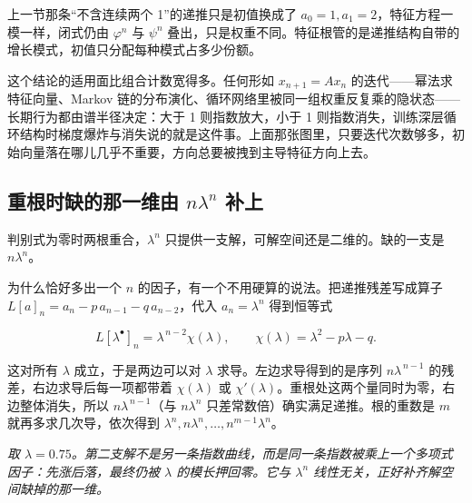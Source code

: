 上一节那条``不含连续两个 1''的递推只是初值换成了 \(a_0=1,a_1=2\)，特征方程一模一样，闭式仍由 \(\varphi^{n}\) 与 \(\psi^{n}\) 叠出，只是权重不同。特征根管的是递推结构自带的增长模式，初值只分配每种模式占多少份额。

这个结论的适用面比组合计数宽得多。任何形如 \(x_{n+1}=Ax_n\) 的迭代——幂法求特征向量、Markov 链的分布演化、循环网络里被同一组权重反复乘的隐状态——长期行为都由谱半径决定：大于 1 则指数放大，小于 1 则指数消失，训练深层循环结构时梯度爆炸与消失说的就是这件事。上面那张图里，只要迭代次数够多，初始向量落在哪儿几乎不重要，方向总要被拽到主导特征方向上去。

\subsection{重根时缺的那一维由 \texorpdfstring{\(n\lambda^{n}\)}{n·lambda\^{}n} 补上}

判别式为零时两根重合，\(\lambda^{n}\) 只提供一支解，可解空间还是二维的。缺的一支是 \(n\lambda^{n}\)。

为什么恰好多出一个 \(n\) 的因子，有一个不用硬算的说法。把递推残差写成算子 \(L[a]_n=a_n-p\,a_{n-1}-q\,a_{n-2}\)，代入 \(a_n=\lambda^{n}\) 得到恒等式

\[
L[\lambda^{\bullet}]_n=\lambda^{\,n-2}\chi(\lambda),\qquad \chi(\lambda)=\lambda^{2}-p\lambda-q .
\]

这对所有 \(\lambda\) 成立，于是两边可以对 \(\lambda\) 求导。左边求导得到的是序列 \(n\lambda^{\,n-1}\) 的残差，右边求导后每一项都带着 \(\chi(\lambda)\) 或 \(\chi'(\lambda)\)。重根处这两个量同时为零，右边整体消失，所以 \(n\lambda^{\,n-1}\)（与 \(n\lambda^{n}\) 只差常数倍）确实满足递推。根的重数是 \(m\) 就再多求几次导，依次得到 \(\lambda^{n},n\lambda^{n},\ldots,n^{m-1}\lambda^{n}\)。

\begin{center}

\emph{取 \(\lambda=0.75\)。第二支解不是另一条指数曲线，而是同一条指数被乘上一个多项式因子：先涨后落，最终仍被 \(\lambda\) 的模长押回零。它与 \(\lambda^{n}\) 线性无关，正好补齐解空间缺掉的那一维。}
\end{center}

